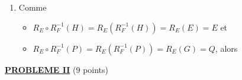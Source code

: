 \begin{description}
\begin{enumerate}
					$R_E\circ R_F^{-1}$ est une translation.
			\item {}
				Comme
				\begin{itemize}
					\item $R_E \circ R_F^{-1} (H) = R_E \left( R_F ^{-1} (H) \right) = R_E (E) = E$ et
					\item $R_E \circ R_F^{-1} (P) = R_E \left( R_F ^{-1} (P) \right) = R_E (G) = Q$, alors
				\end{itemize}
		\end{enumerate}
\end{description}
\noindent \underline{\textsc{\textbf{PROBLEME II}}} (9 points)
